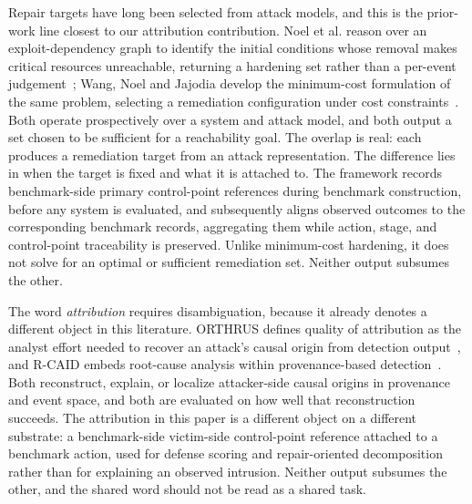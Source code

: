 Repair targets have long been selected from attack models, and this is the prior-work line closest to our attribution contribution. Noel et al. reason over an exploit-dependency graph to identify the initial conditions whose removal makes critical resources unreachable, returning a hardening set rather than a per-event judgement~\cite{noel2003hardening}; Wang, Noel and Jajodia develop the minimum-cost formulation of the same problem, selecting a remediation configuration under cost constraints~\cite{wang2006hardening}. Both operate prospectively over a system and attack model, and both output a set chosen to be sufficient for a reachability goal. The overlap is real: each produces a remediation target from an attack representation. The difference lies in when the target is fixed and what it is attached to. The framework records benchmark-side primary control-point references during benchmark construction, before any system is evaluated, and subsequently aligns observed outcomes to the corresponding benchmark records, aggregating them while action, stage, and control-point traceability is preserved. Unlike minimum-cost hardening, it does not solve for an optimal or sufficient remediation set. Neither output subsumes the other.

The word \emph{attribution} requires disambiguation, because it already denotes a different object in this literature. ORTHRUS defines quality of attribution as the analyst effort needed to recover an attack's causal origin from detection output~\cite{jiang2025orthrus}, and R-CAID embeds root-cause analysis within provenance-based detection~\cite{goyal2024rcaid}. Both reconstruct, explain, or localize attacker-side causal origins in provenance and event space, and both are evaluated on how well that reconstruction succeeds. The attribution in this paper is a different object on a different substrate: a benchmark-side victim-side control-point reference attached to a benchmark action, used for defense scoring and repair-oriented decomposition rather than for explaining an observed intrusion. Neither output subsumes the other, and the shared word should not be read as a shared task.

